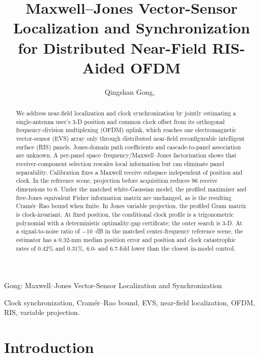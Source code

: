 \documentclass[letterpaper,journal]{IEEEtran}
\begin{document}
\title{Maxwell--Jones Vector-Sensor Localization and Synchronization for
Distributed Near-Field RIS-Aided OFDM}

\author{Qingshan Gong,~}

%
{Gong: Maxwell--Jones Vector-Sensor Localization and Synchronization}

\maketitle

\begin{abstract}
We address near-field localization and clock synchronization by jointly estimating
a single-antenna user's 3-D position and common clock offset from its
orthogonal frequency-division multiplexing (OFDM) uplink, which reaches
one electromagnetic vector-sensor (EVS) array only through distributed
near-field reconfigurable intelligent surface (RIS) panels. Jones-domain path
coefficients and cascade-to-panel association are unknown. A
per-panel space--frequency/Maxwell--Jones factorization shows that
receiver-component selection rescales local information but can eliminate
panel separability. Calibration fixes a Maxwell receive subspace independent
of position and clock. In the reference scene, projection before acquisition
reduces $96$ receive dimensions to $6$. Under the matched white-Gaussian
model, the profiled maximizer and free-Jones equivalent Fisher information
matrix are unchanged, as is the resulting Cram\'er--Rao bound when finite.
In Jones variable projection, the profiled Gram matrix is clock-invariant. At fixed
position, the conditional clock profile is a trigonometric polynomial with a
deterministic optimality-gap certificate; the outer search is 3-D. At a
signal-to-noise ratio of $-10$~dB in the
matched center-frequency reference scene, the estimator has a $0.32$-mm
median position error and position and clock catastrophic rates of $0.42\%$
and $0.31\%$, $6.0$- and $6.7$-fold lower than the closest in-model control.
\end{abstract}

\begin{IEEEkeywords}
Clock synchronization, Cram\'er--Rao bound, EVS, near-field localization,
OFDM, RIS, variable projection.
\end{IEEEkeywords}


\section{Introduction}
\label{sec:introduction}
\end{document}
